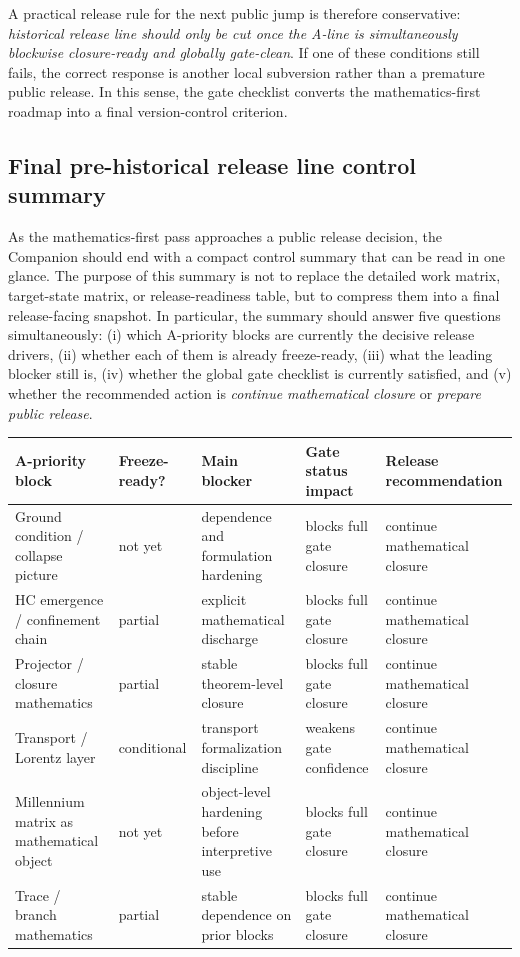 \documentclass[12pt,a4paper]{article}
\DeclareRobustCommand{\QSCver}[1]{archival stage}
\renewcommand{\QSCver}[1]{historical release line}
\begin{document}
A practical release rule for the next public jump is therefore conservative: \emph{\QSCver{v2.27.0} should only be cut once the A-line is simultaneously blockwise closure-ready and globally gate-clean}. If one of these conditions still fails, the correct response is another local subversion rather than a premature public release. In this sense, the gate checklist converts the mathematics-first roadmap into a final version-control criterion.

\subsection*{Final pre-\QSCver{v2.27.0} control summary}
As the mathematics-first pass approaches a public release decision, the Companion should end with a compact control summary that can be read in one glance. The purpose of this summary is not to replace the detailed work matrix, target-state matrix, or release-readiness table, but to compress them into a final release-facing snapshot. In particular, the summary should answer five questions simultaneously: (i) which A-priority blocks are currently the decisive release drivers, (ii) whether each of them is already freeze-ready, (iii) what the leading blocker still is, (iv) whether the global gate checklist is currently satisfied, and (v) whether the recommended action is \emph{continue mathematical closure} or \emph{prepare public release}.

\begin{center}
\small\begin{tabular}{P{0.18\textwidth} P{0.11\textwidth} P{0.18\textwidth} P{0.14\textwidth} P{0.27\textwidth}}
\toprule
\textbf{A-priority block} & \textbf{Freeze-ready?} & \textbf{Main blocker} & \textbf{Gate status impact} & \textbf{Release recommendation}\\
\midrule
Ground condition / collapse picture & not yet & dependence and formulation hardening & blocks full gate closure & continue mathematical closure\\
HC emergence / confinement chain & partial & explicit mathematical discharge & blocks full gate closure & continue mathematical closure\\
Projector / closure mathematics & partial & stable theorem-level closure & blocks full gate closure & continue mathematical closure\\
Transport / Lorentz layer & conditional & transport formalization discipline & weakens gate confidence & continue mathematical closure\\
Millennium matrix as mathematical object & not yet & object-level hardening before interpretive use & blocks full gate closure & continue mathematical closure\\
Trace / branch mathematics & partial & stable dependence on prior blocks & blocks full gate closure & continue mathematical closure\\
\bottomrule
\end{tabular}
\end{center}
\end{document}
